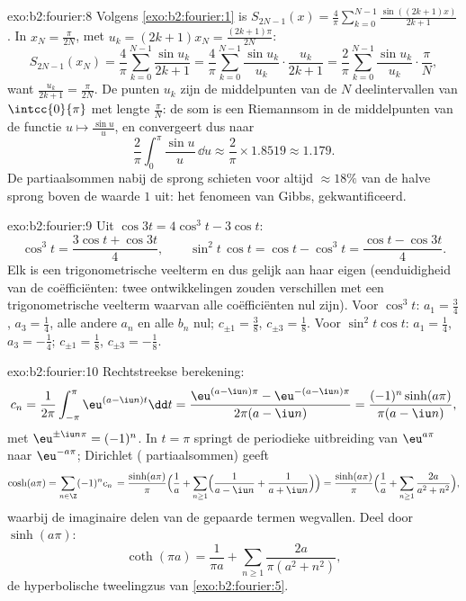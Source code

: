 \begin{solution}{exo:b2:fourier:8}
Volgens \cref{exo:b2:fourier:1} is $S_{2N-1}(x) =
\frac4\pi\sum_{k=0}^{N-1}\frac{\sin((2k+1)x)}{2k+1}$. In $x_N =
\frac{\pi}{2N}$, met $u_k = (2k+1)x_N = \frac{(2k+1)\pi}{2N}$:
\[
S_{2N-1}(x_N) = \frac{4}{\pi}\sum_{k=0}^{N-1}\frac{\sin u_k}{2k+1}
= \frac{4}{\pi}\sum_{k=0}^{N-1}\frac{\sin u_k}{u_k}\cdot
\frac{u_k}{2k+1}
= \frac{2}{\pi}\sum_{k=0}^{N-1}\frac{\sin u_k}{u_k}\cdot
\frac{\pi}{N},
\]
want $\frac{u_k}{2k+1} = \frac{\pi}{2N}$. De punten $u_k$ zijn de
middelpunten van de $N$ deelintervallen van $\intcc{0}{\pi}$ met
lengte $\frac{\pi}{N}$: de som is een Riemannsom in de middelpunten
van de  functie $u \mapsto \frac{\sin u}{u}$, en
convergeert dus naar
\[
\frac{2}{\pi}\int_0^\pi \frac{\sin u}{u}\,\dd u
\approx \frac{2}{\pi}\times 1.8519 \approx 1.179 .
\]
De partiaalsommen nabij de sprong schieten voor altijd $\approx
18\%$ van de halve sprong boven de waarde $1$ uit: het fenomeen van
Gibbs, gekwantificeerd.
\end{solution}

\begin{solution}{exo:b2:fourier:9}
Uit $\cos 3t = 4\cos^3t - 3\cos t$:
\[
\cos^3 t = \frac{3\cos t + \cos 3t}{4},
\qquad
\sin^2t\,\cos t = \cos t - \cos^3 t
= \frac{\cos t - \cos 3t}{4} .
\]
Elk is een trigonometrische veelterm en dus gelijk aan haar eigen
 (eenduidigheid van de coëfficiënten: twee
ontwikkelingen zouden verschillen met een trigonometrische
veelterm waarvan alle coëfficiënten nul zijn). Voor $\cos^3t$: $a_1
= \frac34$, $a_3 = \frac14$, alle andere $a_n$ en alle $b_n$ nul;
$c_{\pm1} = \frac38$, $c_{\pm3} = \frac18$. Voor $\sin^2t\cos t$:
$a_1 = \frac14$, $a_3 = -\frac14$; $c_{\pm1} = \frac18$, $c_{\pm3}
= -\frac18$.
\end{solution}

\begin{solution}{exo:b2:fourier:10}
Rechtstreekse berekening:
\[
c_n = \frac{1}{2\pi}\int_{-\pi}^{\pi}\eu^{(a - \iu n)t}\dd t
= \frac{\eu^{(a-\iu n)\pi} - \eu^{-(a - \iu n)\pi}}
{2\pi(a - \iu n)}
= \frac{(-1)^n\sinh(a\pi)}{\pi(a - \iu n)} ,
\]
met $\eu^{\pm\iu n\pi} = (-1)^n$. In $t = \pi$ springt de
periodieke uitbreiding van $\eu^{a\pi}$ naar $\eu^{-a\pi}$;
Dirichlet ( partiaalsommen) geeft
\[
\cosh(a\pi) = \sum_{n\in\Z}(-1)^n c_n\,
= \frac{\sinh(a\pi)}{\pi}\Bigl(\frac1a +
\sum_{n\geq1}\Bigl(\frac{1}{a - \iu n} +
\frac{1}{a + \iu n}\Bigr)\Bigr)
= \frac{\sinh(a\pi)}{\pi}\Bigl(\frac1a +
\sum_{n\geq1}\frac{2a}{a^2 + n^2}\Bigr) ,
\]
waarbij de imaginaire delen van de gepaarde termen wegvallen. Deel
door $\sinh(a\pi)$:
\[
\coth(\pi a) = \frac{1}{\pi a} +
\sum_{n\geq1}\frac{2a}{\pi(a^2 + n^2)} ,
\]
de hyperbolische tweelingzus van \cref{exo:b2:fourier:5}.
\end{solution}

